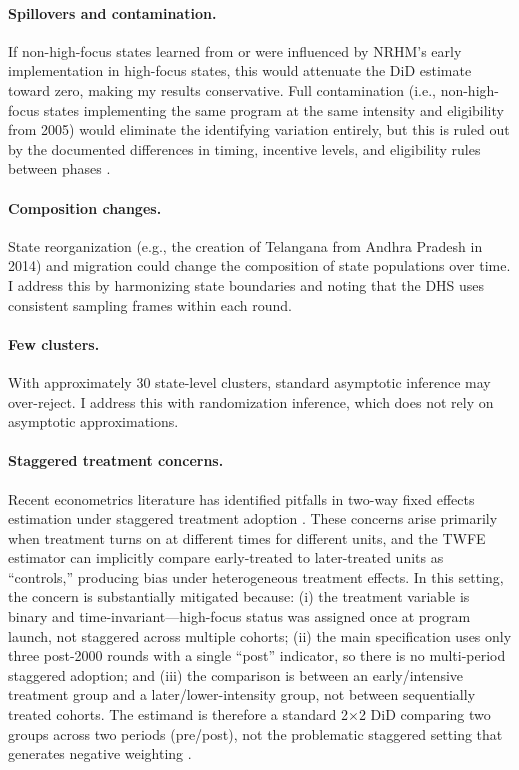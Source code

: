 \documentclass[12pt]{article}
\begin{document}
\paragraph{Spillovers and contamination.} If non-high-focus states learned from or were influenced by NRHM's early implementation in high-focus states, this would attenuate the DiD estimate toward zero, making my results conservative. Full contamination (i.e., non-high-focus states implementing the same program at the same intensity and eligibility from 2005) would eliminate the identifying variation entirely, but this is ruled out by the documented differences in timing, incentive levels, and eligibility rules between phases \citep{NRHM2012}.

\paragraph{Composition changes.} State reorganization (e.g., the creation of Telangana from Andhra Pradesh in 2014) and migration could change the composition of state populations over time. I address this by harmonizing state boundaries and noting that the DHS uses consistent sampling frames within each round.

\paragraph{Few clusters.} With approximately 30 state-level clusters, standard asymptotic inference may over-reject. I address this with randomization inference, which does not rely on asymptotic approximations.

\paragraph{Staggered treatment concerns.} Recent econometrics literature has identified pitfalls in two-way fixed effects estimation under staggered treatment adoption \citep{goodmanbacon2021difference, callaway2021difference, sun2021estimating}. These concerns arise primarily when treatment turns on at different times for different units, and the TWFE estimator can implicitly compare early-treated to later-treated units as ``controls,'' producing bias under heterogeneous treatment effects. In this setting, the concern is substantially mitigated because: (i) the treatment variable is binary and time-invariant---high-focus status was assigned once at program launch, not staggered across multiple cohorts; (ii) the main specification uses only three post-2000 rounds with a single ``post'' indicator, so there is no multi-period staggered adoption; and (iii) the comparison is between an early/intensive treatment group and a later/lower-intensity group, not between sequentially treated cohorts. The estimand is therefore a standard 2$\times$2 DiD comparing two groups across two periods (pre/post), not the problematic staggered setting that generates negative weighting \citep{roth2023pretest}.
\end{document}
